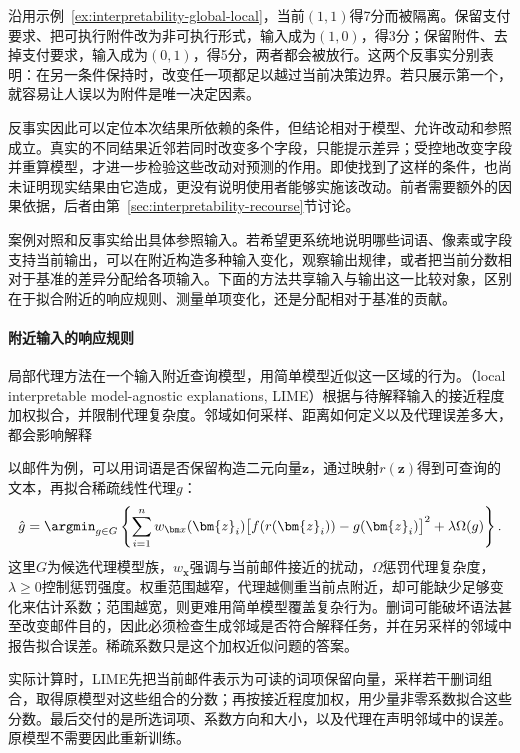 沿用示例~\ref{ex:interpretability-global-local}，当前$(1,1)$得7分而被隔离。保留支付要求、把可执行附件改为非可执行形式，输入成为$(1,0)$，得3分；保留附件、去掉支付要求，输入成为$(0,1)$，得5分，两者都会被放行。这两个反事实分别表明：在另一条件保持时，改变任一项都足以越过当前决策边界。若只展示第一个，就容易让人误以为附件是唯一决定因素。

反事实因此可以定位本次结果所依赖的条件，但结论相对于模型、允许改动和参照成立。真实的不同结果近邻若同时改变多个字段，只能提示差异；受控地改变字段并重算模型，才进一步检验这些改动对预测的作用。即使找到了这样的条件，也尚未证明现实结果由它造成，更没有说明使用者能够实施该改动。前者需要额外的因果依据，后者由第~\ref{sec:interpretability-recourse}节讨论。

案例对照和反事实给出具体参照输入。若希望更系统地说明哪些词语、像素或字段支持当前输出，可以在附近构造多种输入变化，观察输出规律，或者把当前分数相对于基准的差异分配给各项输入。下面的方法共享输入与输出这一比较对象，区别在于拟合附近的响应规则、测量单项变化，还是分配相对于基准的贡献。

\paragraph{附近输入的响应规则}

局部代理方法在一个输入附近查询模型，用简单模型近似这一区域的行为。（local interpretable model-agnostic explanations, LIME）根据与待解释输入的接近程度加权拟合，并限制代理复杂度。邻域如何采样、距离如何定义以及代理误差多大，都会影响解释

以邮件为例，可以用词语是否保留构造二元向量$\bm{z}$，通过映射$r(\bm{z})$得到可查询的文本，再拟合稀疏线性代理$g$：
\begin{equation}
 \hat g=\argmin_{g\in G}\left\{
 \sum_{i=1}^{n}w_{\bm x}(\bm{z}_i)
 \bigl[f(r(\bm{z}_i))-g(\bm{z}_i)\bigr]^2
 +\lambda\Omega(g)\right\}.
 \label{eq:interpretability-lime}
\end{equation}
这里$G$为候选代理模型族，$w_{\bm x}$强调与当前邮件接近的扰动，$\Omega$惩罚代理复杂度，$\lambda\geq0$控制惩罚强度。权重范围越窄，代理越侧重当前点附近，却可能缺少足够变化来估计系数；范围越宽，则更难用简单模型覆盖复杂行为。删词可能破坏语法甚至改变邮件目的，因此必须检查生成邻域是否符合解释任务，并在另采样的邻域中报告拟合误差。稀疏系数只是这个加权近似问题的答案。

实际计算时，LIME先把当前邮件表示为可读的词项保留向量，采样若干删词组合，取得原模型对这些组合的分数；再按接近程度加权，用少量非零系数拟合这些分数。最后交付的是所选词项、系数方向和大小，以及代理在声明邻域中的误差。原模型不需要因此重新训练。

